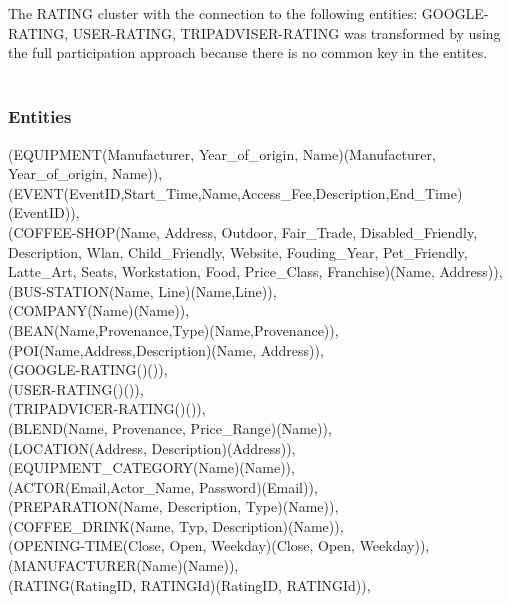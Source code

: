 The RATING cluster with the connection to the following entities: GOOGLE-RATING, USER-RATING, TRIPADVISER-RATING was transformed by using the full participation approach because there is no common key in the entites.\\\\
{ 
\subsubsection{Entities}
(EQUIPMENT(Manufacturer, Year\_of\_origin, Name)(Manufacturer, Year\_of\_origin, Name)),\\
(EVENT(EventID,Start\_Time,Name,Access\_Fee,Description,End\_Time)(EventID)),\\
(COFFEE-SHOP(Name, Address, Outdoor, Fair\_Trade, Disabled\_Friendly, Description, Wlan, Child\_Friendly, Website, Fouding\_Year, Pet\_Friendly, Latte\_Art, Seats, Workstation, Food, Price\_Class, Franchise)(Name, Address)), \\
(BUS-STATION(Name, Line)(Name,Line)),\\
(COMPANY(Name)(Name)),\\
(BEAN(Name,Provenance,Type)(Name,Provenance)),\\
(POI(Name,Address,Description)(Name, Address)), \\
(GOOGLE-RATING()()), \\
(USER-RATING()()), \\
(TRIPADVICER-RATING()()), \\
(BLEND(Name, Provenance, Price\_Range)(Name)), \\
(LOCATION(Address, Description)(Address)), \\
(EQUIPMENT\_CATEGORY(Name)(Name)), \\
(ACTOR(Email,Actor\_Name, Password)(Email)), \\
(PREPARATION(Name, Description, Type)(Name)), \\
(COFFEE\_DRINK(Name, Typ, Description)(Name)), \\
(OPENING-TIME(Close, Open, Weekday)(Close, Open, Weekday)), \\
(MANUFACTURER(Name)(Name)), \\
(RATING(RatingID, RATINGId)(RatingID, RATINGId)),  \\
}
